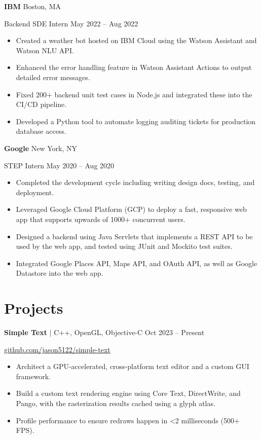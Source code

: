 \documentclass[11pt]{article}
\newcommand{\resumeentry}[4]{%
\textbf{#1} \hfill {\small #2}
\par
{\small #3} \hfill {\small #4}}
\begin{document}
\smallskip

\resumeentry{IBM}{Boston, MA}{Backend SDE Intern}{May 2022 -- Aug 2022}
\begin{itemize}
  \item Created a weather bot hosted on IBM Cloud using the Watson Assistant and Watson NLU API.
  \item Enhanced the error handling feature in Watson Assistant Actions to output detailed error messages.
  \item Fixed 200+ backend unit test cases in Node.js and integrated these into the CI/CD pipeline.
  \item Developed a Python tool to automate logging auditing tickets for production database access.
\end{itemize}

\smallskip

\resumeentry{Google}{New York, NY}{STEP Intern}{May 2020 -- Aug 2020}
\begin{itemize}
  \item Completed the development cycle including writing design docs, testing, and deployment.
  \item Leveraged Google Cloud Platform (GCP) to deploy a fast, responsive web app that supports upwards of 1000+ concurrent users.
  \item Designed a backend using Java Servlets that implements a REST API to be used by the web app, and tested using JUnit and Mockito test suites.
  \item Integrated Google Places API, Maps API, and OAuth API, as well as Google Datastore into the web app.
\end{itemize}

\section{Projects}
\textbf{Simple Text} $|$ {\small C++, OpenGL, Objective-C} \hfill {\small Oct 2023 -- Present}
\par
{\small \href{https://github.com/jason5122/simple-text}{github.com/jason5122/simple-text}}
\begin{itemize}
  \item Architect a GPU-accelerated, cross-platform text editor and a custom GUI framework.
  \item Build a custom text rendering engine using Core Text, DirectWrite, and Pango, with the rasterization results cached using a glyph atlas.
  \item Profile performance to ensure redraws happen in <2 milliseconds (500+ FPS).
\end{itemize}
\end{document}

